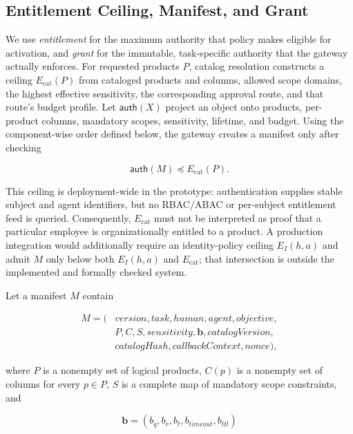 \documentclass[10pt,journal,compsoc]{IEEEtran}
\newcommand{\vect}[1]{\boldsymbol{#1}}
\begin{document}
\subsection{Entitlement Ceiling, Manifest, and Grant}

We use \emph{entitlement} for the maximum authority that policy makes eligible
for activation, and \emph{grant} for the immutable, task-specific authority that
the gateway actually enforces.  For requested products $P$, catalog resolution
constructs a ceiling $E_{\mathrm{cat}}(P)$ from cataloged products and columns, allowed
scope domains, the highest effective sensitivity, the corresponding approval
route, and that route's budget profile.  Let $\mathsf{auth}(X)$ project an object
onto products, per-product columns, mandatory scopes, sensitivity, lifetime, and
budget.  Using the component-wise order defined below, the gateway creates a
manifest only after checking

\begin{equation}
  \mathsf{auth}(M)\preceq E_{\mathrm{cat}}(P).
  \label{eq:catalog-entitlement}
\end{equation}

This ceiling is deployment-wide in the prototype: authentication supplies stable
subject and agent identifiers, but no RBAC/ABAC or per-subject entitlement feed
is queried.  Consequently, $E_{\mathrm{cat}}$ must not be interpreted as proof that a
particular employee is organizationally entitled to a product.  A production
integration would additionally require an identity-policy ceiling $E_I(h,a)$ and
admit $M$ only below both $E_I(h,a)$ and $E_{\mathrm{cat}}$; that intersection is outside
the implemented and formally checked system.

Let a manifest $M$ contain

\begin{align*}
M = (&version, task, human, agent, objective,\\
     &P, C, S, sensitivity, \vect{b}, catalogVersion,\\
     &catalogHash, callbackContext, nonce),
\end{align*}

where $P$ is a nonempty set of logical products, $C(p)$ is a nonempty set of
columns for every $p\in P$, $S$ is a complete map of mandatory scope
constraints, and

\begin{equation}
\vect{b}=(b_q,b_r,b_t,b_{timeout},b_{ttl})
\end{equation}
\end{document}
